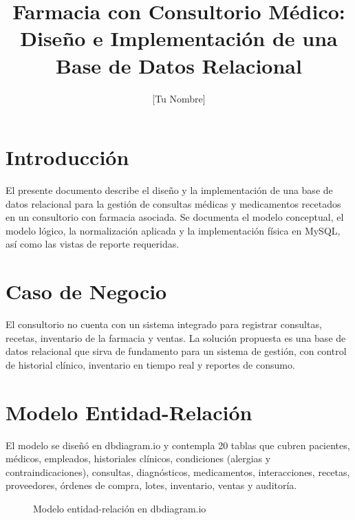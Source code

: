 \documentclass[stu,12pt,floatsintext]{apa7}
\title{Farmacia con Consultorio Médico: Diseño e Implementación de una Base de Datos Relacional}
\author{[Tu Nombre]}
\affiliation{[Institución]}
\begin{document}
\maketitle

\section{Introducción}
El presente documento describe el diseño y la implementación de una base de
datos relacional para la gestión de consultas médicas y medicamentos recetados
en un consultorio con farmacia asociada. Se documenta el modelo conceptual, el
modelo lógico, la normalización aplicada y la implementación física en MySQL,
así como las vistas de reporte requeridas.

\section{Caso de Negocio}
El consultorio no cuenta con un sistema integrado para registrar consultas,
recetas, inventario de la farmacia y ventas. La solución propuesta es una base
de datos relacional que sirva de fundamento para un sistema de gestión, con
control de historial clínico, inventario en tiempo real y reportes de consumo.

\section{Modelo Entidad-Relación}
El modelo se diseñó en dbdiagram.io y contempla 20 tablas que cubren pacientes,
médicos, empleados, historiales clínicos, condiciones (alergias y
contraindicaciones), consultas, diagnósticos, medicamentos, interacciones,
recetas, proveedores, órdenes de compra, lotes, inventario, ventas y auditoría.

\begin{figure}
    \caption{Modelo entidad-relación en dbdiagram.io}
    \centering
    \label{fig:der}
\end{figure}
\end{document}
